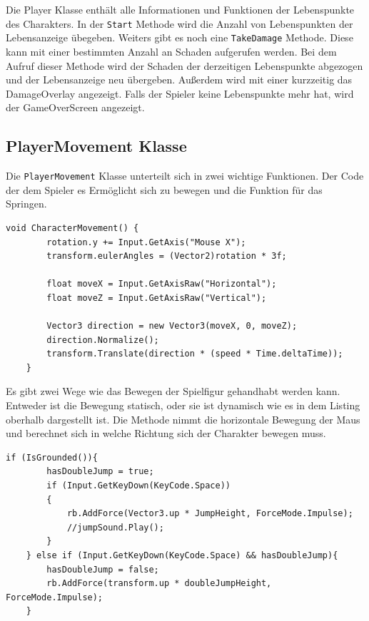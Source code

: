 Die Player Klasse enthält alle Informationen und Funktionen der Lebenspunkte des Charakters. In der \verb+Start+ Methode wird die Anzahl von Lebenspunkten der Lebensanzeige übegeben. Weiters gibt es noch eine \verb+TakeDamage+ Methode. Diese kann mit einer bestimmten Anzahl an Schaden aufgerufen werden. Bei dem Aufruf dieser Methode wird der Schaden der derzeitigen Lebenspunkte abgezogen und der Lebensanzeige neu übergeben. Außerdem wird mit einer  kurzzeitig das DamageOverlay angezeigt. Falls der Spieler keine Lebenspunkte mehr hat, wird der GameOverScreen angezeigt.

\pagebreak

\subsection{PlayerMovement Klasse}
Die \verb+PlayerMovement+ Klasse unterteilt sich in zwei wichtige Funktionen. Der Code der dem Spieler es Ermöglicht sich zu bewegen und die Funktion für das Springen.\\

\begin{lstlisting}[language=CSharp,caption={CharacterMovement der PlayerMovement Klasse.},label=code:charactermovement]
    void CharacterMovement() {
        rotation.y += Input.GetAxis("Mouse X");
        transform.eulerAngles = (Vector2)rotation * 3f;
        
        float moveX = Input.GetAxisRaw("Horizontal");
        float moveZ = Input.GetAxisRaw("Vertical");
    
        Vector3 direction = new Vector3(moveX, 0, moveZ);
        direction.Normalize();
        transform.Translate(direction * (speed * Time.deltaTime));
    }
\end{lstlisting}

Es gibt zwei Wege wie das Bewegen der Spielfigur gehandhabt werden kann. Entweder ist die Bewegung statisch, oder sie ist dynamisch wie es in dem Listing oberhalb dargestellt ist. Die Methode nimmt die horizontale Bewegung der Maus und berechnet sich in welche Richtung sich der Charakter bewegen muss.\\

\begin{lstlisting}[language=CSharp,caption={Jump \& DoubleJump der PlayerMovement Klasse.},label=code:player]
    if (IsGrounded()){
        hasDoubleJump = true;
        if (Input.GetKeyDown(KeyCode.Space))
        {
            rb.AddForce(Vector3.up * JumpHeight, ForceMode.Impulse);
            //jumpSound.Play();
        }
    } else if (Input.GetKeyDown(KeyCode.Space) && hasDoubleJump){
        hasDoubleJump = false;
        rb.AddForce(transform.up * doubleJumpHeight, ForceMode.Impulse);
    }
\end{lstlisting}


